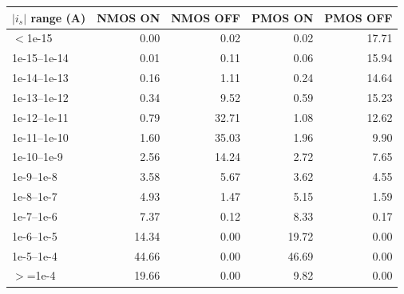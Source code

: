 \begin{tabular}{lrrrr}
\toprule
$|i_s|$ range (A) & NMOS ON & NMOS OFF & PMOS ON & PMOS OFF \\
\midrule
$<$1e-15 & 0.00 & 0.02 & 0.02 & 17.71 \\
1e-15--1e-14 & 0.01 & 0.11 & 0.06 & 15.94 \\
1e-14--1e-13 & 0.16 & 1.11 & 0.24 & 14.64 \\
1e-13--1e-12 & 0.34 & 9.52 & 0.59 & 15.23 \\
1e-12--1e-11 & 0.79 & 32.71 & 1.08 & 12.62 \\
1e-11--1e-10 & 1.60 & 35.03 & 1.96 & 9.90 \\
1e-10--1e-9 & 2.56 & 14.24 & 2.72 & 7.65 \\
1e-9--1e-8 & 3.58 & 5.67 & 3.62 & 4.55 \\
1e-8--1e-7 & 4.93 & 1.47 & 5.15 & 1.59 \\
1e-7--1e-6 & 7.37 & 0.12 & 8.33 & 0.17 \\
1e-6--1e-5 & 14.34 & 0.00 & 19.72 & 0.00 \\
1e-5--1e-4 & 44.66 & 0.00 & 46.69 & 0.00 \\
$>$=1e-4 & 19.66 & 0.00 & 9.82 & 0.00 \\
\bottomrule
\end{tabular}
